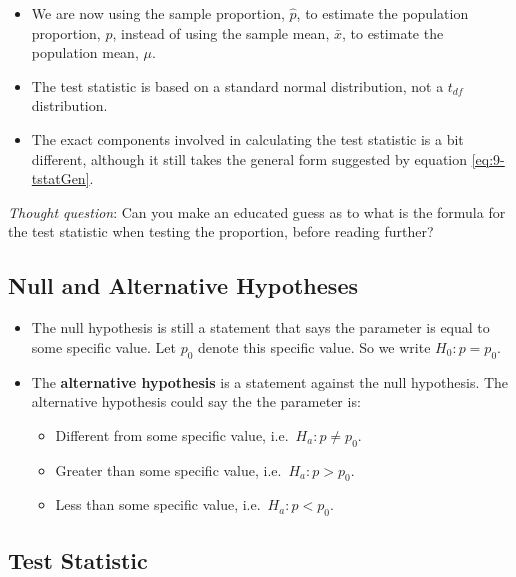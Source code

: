 \documentclass[
]{book}
\begin{document}
\begin{itemize}
\item
  We are now using the sample proportion, \(\hat{p}\), to estimate the population proportion, \(p\), instead of using the sample mean, \(\bar{x}\), to estimate the population mean, \(\mu\).
\item
  The test statistic is based on a standard normal distribution, not a \(t_{df}\) distribution.
\item
  The exact components involved in calculating the test statistic is a bit different, although it still takes the general form suggested by equation \eqref{eq:9-tstatGen}.
\end{itemize}

\emph{Thought question}: Can you make an educated guess as to what is the formula for the test statistic when testing the proportion, before reading further?

\hypertarget{null-and-alternative-hypotheses-1}{%
\subsection{Null and Alternative Hypotheses}\label{null-and-alternative-hypotheses-1}}

\begin{itemize}
\item
  The null hypothesis is still a statement that says the parameter is equal to some specific value. Let \(p_0\) denote this specific value. So we write \(H_0: p = p_0\).
\item
  The \textbf{alternative hypothesis} is a statement against the null hypothesis. The alternative hypothesis could say the the parameter is:

  \begin{itemize}
  \item
    Different from some specific value, i.e.~\(H_a: p \neq p_0\).
  \item
    Greater than some specific value, i.e.~\(H_a: p > p_0\).
  \item
    Less than some specific value, i.e.~\(H_a: p < p_0\).
  \end{itemize}
\end{itemize}

\hypertarget{test-statistic-1}{%
\subsection{Test Statistic}\label{test-statistic-1}}
\end{document}
